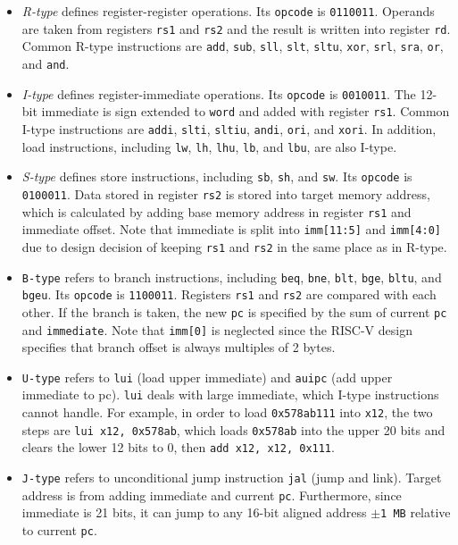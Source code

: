 \begin{itemize}
    \item \textit{R-type} defines register-register operations. Its \texttt{opcode} is \texttt{0110011}. Operands are taken from registers \texttt{rs1} and \texttt{rs2} and the result is written into register \texttt{rd}. Common R-type instructions are \texttt{add}, \texttt{sub}, \texttt{sll}, \texttt{slt}, \texttt{sltu}, \texttt{xor}, \texttt{srl}, \texttt{sra}, \texttt{or}, and \texttt{and}.
    
    \item \textit{I-type} defines register-immediate operations. Its \texttt{opcode} is \texttt{0010011}. The 12-bit immediate is sign extended to \texttt{word} and added with register \texttt{rs1}.
    Common I-type instructions are \texttt{addi}, \texttt{slti}, \texttt{sltiu}, \texttt{andi}, \texttt{ori}, and \texttt{xori}. In addition, load instructions, including \texttt{lw}, \texttt{lh}, \texttt{lhu}, \texttt{lb}, and \texttt{lbu}, are also I-type.
    
    \item \textit{S-type} defines store instructions, including \texttt{sb}, \texttt{sh}, and \texttt{sw}. Its \texttt{opcode} is \texttt{0100011}. Data stored in register \texttt{rs2} is stored into target memory address, which is calculated by adding base memory address in register \texttt{rs1} and immediate offset. Note that immediate is split into \texttt{imm[11:5]} and \texttt{imm[4:0]} due to design decision of keeping \texttt{rs1} and \texttt{rs2} in the same place as in R-type.
    
    \item \texttt{B-type} refers to branch instructions, including \texttt{beq}, \texttt{bne}, \texttt{blt}, \texttt{bge}, \texttt{bltu}, and \texttt{bgeu}. Its \texttt{opcode} is \texttt{1100011}. Registers \texttt{rs1} and \texttt{rs2} are compared with each other. If the branch is taken, the new \texttt{pc} is specified by the sum of current \texttt{pc} and \texttt{immediate}. Note that \texttt{imm[0]} is neglected since the RISC-V design specifies that branch offset is always multiples of 2 bytes.
    
    \item \texttt{U-type} refers to \texttt{lui} (load upper immediate) and \texttt{auipc} (add upper immediate to pc). \texttt{lui} deals with large immediate, which I-type instructions cannot handle. For example, in order to load \texttt{0x578ab111} into \texttt{x12}, the two steps are \texttt{lui x12, 0x578ab}, which loads \texttt{0x578ab} into the upper 20 bits and clears the lower 12 bits to 0, then \texttt{add x12, x12, 0x111}.
    
    \item \texttt{J-type} refers to unconditional jump instruction \texttt{jal} (jump and link). Target address is from adding immediate and current \texttt{pc}. Furthermore, since immediate is 21 bits, it can jump to any 16-bit aligned address \texttt{$\pm$1 MB} relative to current \texttt{pc}.
\end{itemize}

